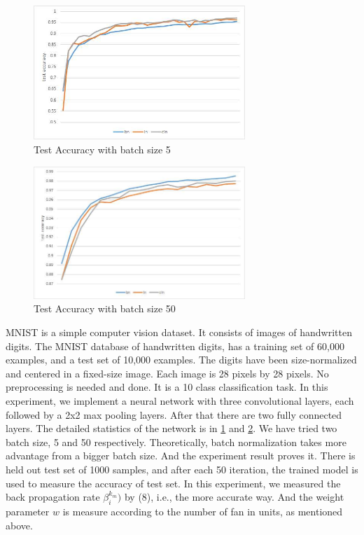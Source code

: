 \documentclass{sig-alternate}
\begin{document}
    \begin{figure}[t!]
        \centering
        \centerline{\includegraphics[width=8cm]{accuracy1}}
        \caption{Test Accuracy with batch size 5}
        \label{fig:mnist_acc1}
    \end{figure}
    \begin{figure}[t!]
        \centering
        \centerline{\includegraphics[width=8cm]{accuracy2}}
        \caption{Test Accuracy with batch size 50}
        \label{fig:mnist_acc2}
    \end{figure}
    
    MNIST is a simple computer vision dataset. It consists of images of handwritten digits. The MNIST database of handwritten digits, has a training set of 60,000 examples, and a test set of 10,000 examples. The digits have been  size-normalized and centered in a fixed-size image. Each image is 28 pixels by 28 pixels. No preprocessing is needed and done. It is a 10 class classification task.
    In this experiment, we implement a neural network with three convolutional layers, each followed by a 2x2 max pooling layers. After that there are two fully connected layers. The detailed statistics of the network is in \ref{fig:mnist_acc1} and \ref{fig:mnist_acc2}. We have tried two batch size, 5 and 50 respectively. Theoretically, batch normalization takes more advantage from a bigger batch size. And the experiment result proves it. There is held out test set of 1000 samples, and after each 50 iteration, the trained model is used to measure the accuracy of test set. In this experiment, we measured the back propagation rate $\beta_i^{k_m})$ by (8), i.e., the more accurate way. And the weight parameter $w$ is measure according to the number of fan in units, as mentioned above. 
    
\end{document}
